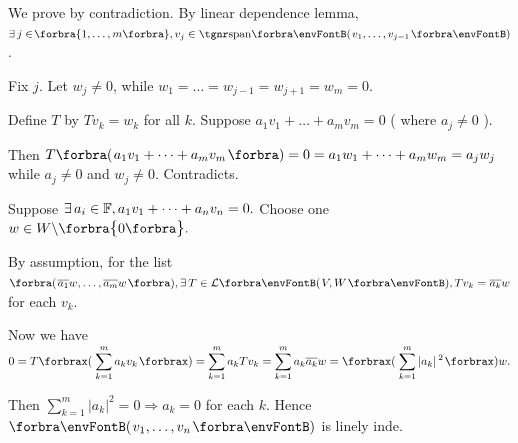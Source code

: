 \documentclass[a4paper, 11pt, UTF8]{article}
\begin{document}
\begin{large}
\par\quad
We prove by contradiction. By linear dependence lemma, $\exists\,j\in\!\Bra{1,\dots,m},v_j\in\Span{v_1,\dots,v_{j-1}}$.\par\quad
Fix $j$. Let $w_j\neq 0$, while $w_1=\dots=w_{j-1}=w_{j+1}=w_m=0.$\par\quad
Define $T$ by $Tv_k=w_k$ for all $k$. Suppose $a_1 v_1+\dots+a_m v_m=0$ ( where $a_j\neq 0$ ).\par\quad
Then $T\BigPar{a_1 v_1+\dots+a_m v_m}=0=a_1 w_1+\dots+a_m w_m=a_j w_j$ while $a_j\neq 0$ and $w_j\neq 0.$ Contradicts.\PfEnd\vspace{12pt}\quad
\Or {}\par\quad
\Blind{\Or \;}\par\quad
{}\par\quad
{\Large\vspace{6pt}Suppose $\exists\,a_i\in{\mathbb{F}},a_1 v_1+\dots+a_n v_n=0.$ Choose one $w\in W\backslash\envFontDefault\zeroSubs.$}\par\quad
{\Large\vspace{10pt}By assumption, for the list $\BigPar{\overline{a_1}w,\dots,\overline{a_m}w},\exists\,T\in\Lm{V,W},Tv_k=\overline{a_k}w$ for each $v_k.$}\par\quad
{\Large\vspace{10pt}Now we have $\displaystyle 0=T\XPar{\sum\limits_{k=1}^m a_k v_k}=\sum\limits_{k=1}^m a_k Tv_k=\sum\limits_{k=1}^m a_k\overline{a_k}w=\XPar{\sum\limits_{k=1}^m \left|a_k\right|{^2}}w.$}\par\quad
{\Large Then $\sum_{k=1}^m\left|a_k\right|^2=0\Rightarrow a_k=0$ for each $k.$ Hence $\Par{v_1,\dots,v_n}$ is linely inde.}\PfEnd
\SepLine\pagebreak


\end{large}
\end{document}
